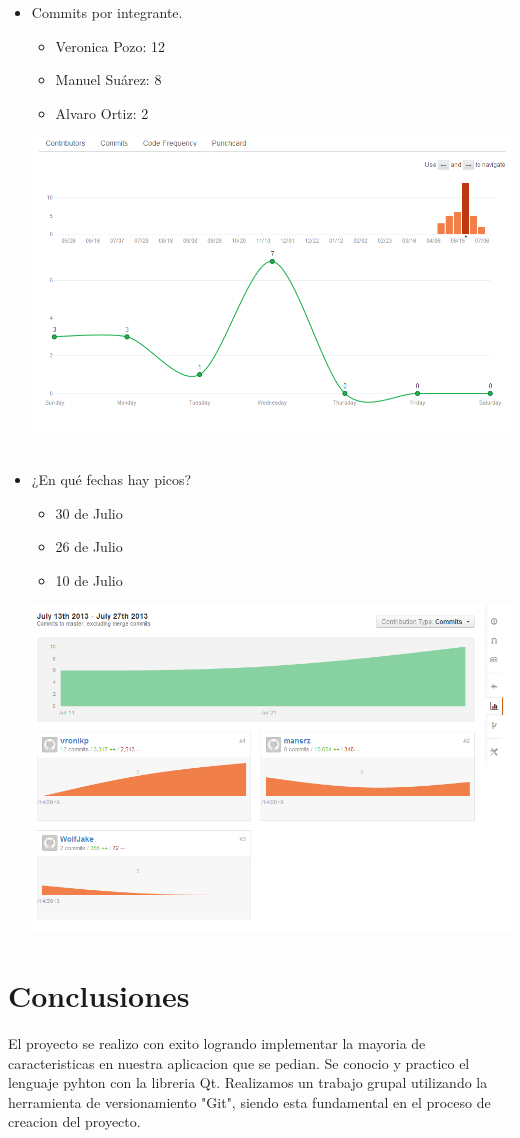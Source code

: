 \documentclass[12pt,oneside]{book}
\begin{document}
\begin {itemize}	

\item Commits por integrante.
\begin{itemize}
\item Veronica Pozo: 12
\item Manuel Suárez: 8
\item Alvaro Ortiz: 2
\end{itemize}

\includegraphics[width=1.10\textwidth]{./imagenes/Contribuidores_linea.png}
\
\
\
\
\
\
\

\item ¿En qué fechas hay picos?
\begin{itemize}
\item 30 de Julio
\item 26 de Julio
\item 10 de Julio
\end{itemize}
	\includegraphics[width=1.10\textwidth]{./imagenes/Contribuidores_commit.png}
\end{itemize}
\chapter{Conclusiones}
El proyecto se realizo con exito logrando implementar la mayoria de caracteristicas en nuestra aplicacion que se pedian. 
Se conocio y practico el lenguaje pyhton con la libreria Qt.
Realizamos un trabajo grupal utilizando la herramienta de versionamiento "Git", siendo esta fundamental en el proceso de creacion
del proyecto. 
\end{document}
